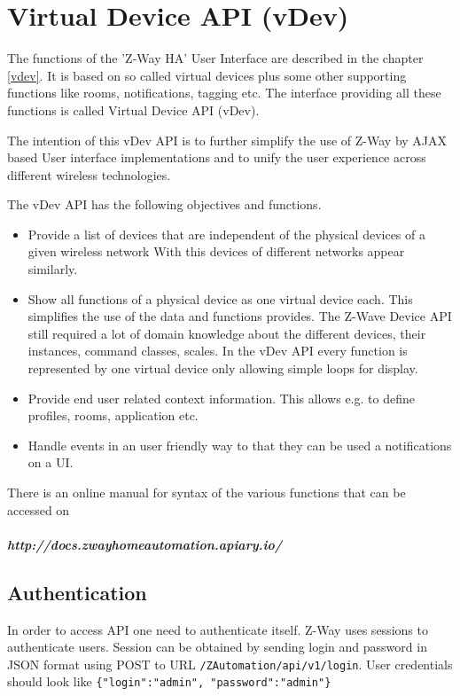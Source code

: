 \chapter{Virtual Device API (vDev)}
\label{vdevapi}


The functions of the 'Z-Way HA' User Interface are described in the chapter \ref{vdev}. 
It  is based on so called virtual devices plus some other supporting functions
like rooms, notifications, tagging etc. The interface providing all these functions is 
called Virtual Device API (vDev).

The intention of this vDev API  is to further simplify the use of Z-Way by AJAX based 
User interface implementations and to unify the user experience across
different wireless technologies.
  
The vDev API has the following objectives and functions.

\begin{itemize}
\item Provide a list of devices that are independent of the physical devices of a 
given wireless network With this devices of different networks appear similarly.
\item Show all functions of a physical device as one virtual device each. This simplifies
the use of the data and functions provides. The Z-Wave Device API still required 
a lot of domain knowledge about the different devices, their instances, command classes, 
scales. In the vDev API every function is represented by one virtual device only 
allowing simple loops for display.
\item Provide end user related context information. This allows e.g. to define profiles, 
rooms, application etc.
\item Handle events in an user friendly way to that they can be used a notifications on a UI.
\end{itemize}

There is an online manual for syntax of the various functions that can be accessed on 

\paragraph{http://docs.zwayhomeautomation.apiary.io/}

\section{Authentication}

In order to access API one need to authenticate itself. Z-Way uses sessions
to authenticate users. Session can be obtained by sending login and password
in JSON format using POST to URL \texttt{/ZAutomation/api/v1/login}. User
credentials should look like \texttt{\{"login":"admin", "password":"admin"\}}

